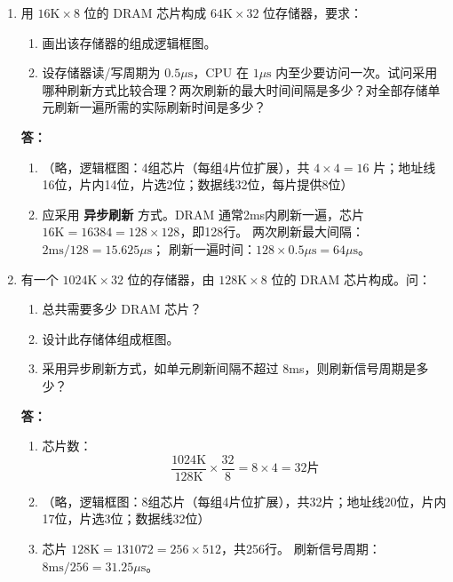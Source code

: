 \documentclass{article}
\begin{document}
\begin{enumerate}[label=\arabic*.]
    \item 用 $16\text{K}\times8$ 位的 DRAM 芯片构成 $64\text{K}\times32$ 位存储器，要求：
    \begin{enumerate}[label=(\arabic*)]
        \item 画出该存储器的组成逻辑框图。
        \item 设存储器读/写周期为 $0.5\mu\text{s}$，CPU 在 $1\mu\text{s}$ 内至少要访问一次。试问采用哪种刷新方式比较合理？两次刷新的最大时间间隔是多少？对全部存储单元刷新一遍所需的实际刷新时间是多少？
    \end{enumerate}
    
    \textbf{答：}
    \begin{enumerate}[label=(\arabic*)]
        \item （略，逻辑框图：4组芯片（每组4片位扩展），共 $4\times4=16$ 片；地址线16位，片内14位，片选2位；数据线32位，每片提供8位）
        \item 应采用 \textbf{异步刷新} 方式。DRAM 通常2ms内刷新一遍，芯片 $16\text{K}=16384=128\times128$，即128行。
        两次刷新最大间隔：$2\text{ms}/128=15.625\mu\text{s}$；
        刷新一遍时间：$128\times0.5\mu\text{s}=64\mu\text{s}$。
    \end{enumerate}

    \item 有一个 $1024\text{K}\times32$ 位的存储器，由 $128\text{K}\times8$ 位的 DRAM 芯片构成。问：
    \begin{enumerate}[label=(\arabic*)]
        \item 总共需要多少 DRAM 芯片？
        \item 设计此存储体组成框图。
        \item 采用异步刷新方式，如单元刷新间隔不超过 8ms，则刷新信号周期是多少？
    \end{enumerate}
    
    \textbf{答：}
    \begin{enumerate}[label=(\arabic*)]
        \item 芯片数：
        \[
        \frac{1024\text{K}}{128\text{K}} \times \frac{32}{8} = 8 \times 4 = 32 \text{片}
        \]
        \item （略，逻辑框图：8组芯片（每组4片位扩展），共32片；地址线20位，片内17位，片选3位；数据线32位）
        \item 芯片 $128\text{K}=131072=256\times512$，共256行。
        刷新信号周期：$8\text{ms}/256=31.25\mu\text{s}$。
    \end{enumerate}


\end{enumerate}
\end{document}

